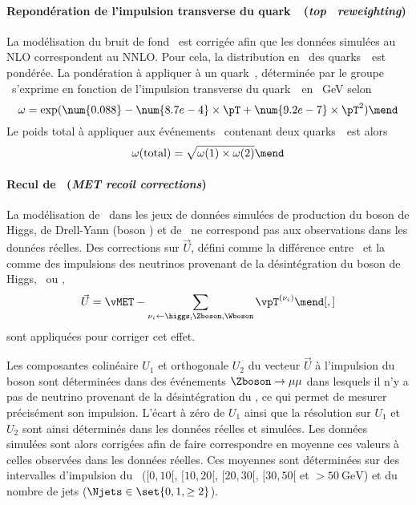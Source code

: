 \paragraph{Repondération de l'impulsion transverse du quark~\quarkt\ (\emph{top \pT\ reweighting})}
La modélisation du bruit de fond \ttbar\ est corrigée afin que les données simulées au NLO correspondent au NNLO.
Pour cela, la distribution en \pT\ des quarks~\quarkt\ est pondérée.
La pondération à appliquer à un quark~\quarkt, déterminée par le groupe \quarkt\antiquarkt\Higgs\ s'exprime en fonction de l'impulsion transverse du quark~\quarkt\ en \SI{}{\GeV} selon
\begin{equation}
\omega = \exp(\num{0.088} - \num{8.7e-4}\times\pT + \num{9.2e-7}\times\pT^2)
\mend
\end{equation}
Le poids total à appliquer aux événements \ttbar\ contenant deux quarks~\quarkt\ est alors
\begin{equation}
\omega(\text{total}) = \sqrt{\omega(1) \times \omega(2)}
\mend
\end{equation}
\paragraph{Recul de \MET\ (\emph{MET recoil corrections})}
La modélisation de \MET\ dans les jeux de données simulées de production du boson de Higgs, de Drell-Yann (boson \Zboson) et de \Wjets\ ne correspond pas aux observations dans les données réelles.
Des corrections sur $\vec{U}$, défini comme la différence entre \MET\ et la comme des impulsions des neutrinos provenant de la désintégration du boson de Higgs, \Zboson\ ou \Wboson, \ie
\begin{equation}
\vec{U} = \vMET - \sum_{\nu_i \leftarrow \higgs,\Zboson,\Wboson} \vpT^{(\nu_i)}
\mend[,]
\end{equation}
sont appliquées pour corriger cet effet.
\par
Les composantes colinéaire $U_1$ et orthogonale $U_2$ du vecteur $\vec{U}$ à l'impulsion du boson sont déterminées dans des événements $\Zboson\to\mu\mu$ dans lesquels il n'y a pas de neutrino provenant de la désintégration du \Zboson, ce qui permet de mesurer précisément son impulsion.
L'écart à zéro de $U_1$ ainsi que la résolution sur $U_1$ et $U_2$ sont ainsi déterminés dans les données réelles et simulées.
Les données simulées sont alors corrigées afin de faire correspondre en moyenne ces valeurs à celles observées dans les données réelles.
Ces moyennes sont déterminées sur des intervalles d'impulsion du \Zboson\ ($[\num{0}, \num{10}[$, $[\num{10}, \num{20}[$, $[\num{20}, \num{30}[$, $[\num{30}, \num{50}[$ et $>\SI{50}{\GeV}$) et du nombre de jets ($\Njets\in\set{0, 1, \geq2}$).
